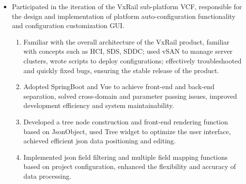 \documentclass{resume}
\newcommand{\en}[1]{#1}
\newcommand{\zh}[1]{}
\begin{document}
\en{}
\zh{\datedsubsection{\textbf{\href{https://www.dell.com/en-us/blog/tags/dell-emc/}{DELL EMC，上海}}}{2021/10 -- 2022/02}}
\en{}
\zh{\role{VxRail VCF\&Netword Team}{后端开发实习生}}
\begin{itemize}
      \item \en{Participated in the iteration of the VxRail sub-platform VCF, responsible for the design and implementation of platform auto-configuration functionality and configuration customization GUI.}
            \zh{参与旗下产品VxRail子平台VCF的迭代，负责平台自动配置功能及配置定制化GUI的设计与实现}
            \begin{enumerate}
                  \item \en{Familiar with the overall architecture of the VxRail product, familiar with concepts such as HCI, SDS, SDDC; used vSAN to manage server clusters, wrote scripts to deploy configurations; effectively troubleshooted and quickly fixed bugs, ensuring the stable release of the product.}
                        \zh{熟悉VxRail产品的整体架构，熟悉HCI、SDS、SDDC等概念；使用vSAN管理服务器集群，编写脚本部署配置；有效排查并快速修复bug，保证了产品的稳定上线。}
                  \item \en{Adopted SpringBoot and Vue to achieve front-end and back-end separation, solved cross-domain and parameter passing issues, improved development efficiency and system maintainability.}
                        \zh{采用SpringBoot和Vue实现前后端分离，解决跨域和参数传递问题，提高了开发效率和系统的可维护性。}
                  \item \en{Developed a tree node construction and front-end rendering function based on JsonObject, used Tree widget to optimize the user interface, achieved efficient json data positioning and editing.}
                        \zh{开发了基于JsonObject的树节点构建和前端渲染功能，使用Tree控件优化用户界面，实现了高效的json数据定位与编辑。}
                  \item \en{Implemented json field filtering and multiple field mapping functions based on project configuration, enhanced the flexibility and accuracy of data processing.}
                        \zh{实现了基于项目配置的json字段过滤和多字段映射功能，增强了数据处理的灵活性和准确性。}
            \end{enumerate}
\end{itemize}
\end{document}
